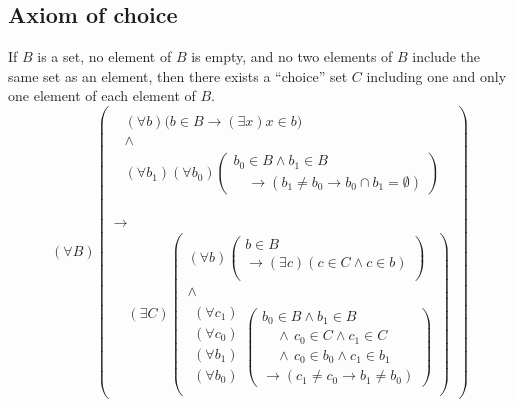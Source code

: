\documentclass[letterpaper]{article}
\begin{document}
\subsection{Axiom of choice}
\begin{axiom}[Choice]\label{axiomchoice}
	If $B$ is a set, no element of $B$ is empty, and no two elements of $B$ include the same set as an element, then there exists a ``choice'' set $C$ including one and only one element of each element of $B$.
	\begin{equation}
	(\forall B)\left(\begin{array}{l}\begin{array}{l}
	\begin{array}{c}
	(\forall b)\big(b\in B\longrightarrow(\exists x)x\in b\big)\\
	\land\\(\forall b_1)(\forall b_0)
	\left(\begin{array}{l}
	b_0\in B\land b_1\in B\\
	\quad\longrightarrow(b_1\ne b_0\longrightarrow b_0\cap b_1=\emptyset)\end{array}\right)\end{array}\\~\\
	\end{array}\\
	\longrightarrow\\\quad
	(\exists C)\left(\begin{array}{c}
	(\forall b)
	\left(\begin{array}{l}
	b\in B\\
	\longrightarrow(\exists c)(c\in C\land c\in b)\\
	\end{array}
	\right)\\
	\land\\
	\begin{array}{r}
	(\forall c_1)\\(\forall c_0)\\
	(\forall b_1)\\(\forall b_0)\\
	\end{array}
	\left(
	\begin{array}{l}
	b_0\in B\land b_1\in B\\
	\quad\land\, c_0\in C\land c_1\in C\\
	\quad\land\, c_0\in b_0 \land c_1\in b_1\\
	\longrightarrow (c_1\ne c_0\longrightarrow b_1\ne b_0)
	\end{array}
	\right)
	\end{array}\right)
	\end{array}\right)\label{choice-eqn}
	\end{equation}
\end{axiom}
\end{document}
